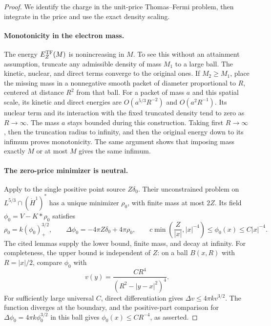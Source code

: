 \begin{proof}
We identify the charge in the unit-price Thomas--Fermi problem, then
integrate in the price and use the exact density scaling.

\paragraph{Monotonicity in the electron mass.}
The energy $E_Z^{\mathrm{TF}}(M)$ is nonincreasing in $M$.  To see this without an
attainment assumption, truncate any admissible density of mass $M_1$ to a
large ball.  The kinetic, nuclear, and direct terms converge to the
original ones.  If $M_2\ge M_1$, place the missing mass in a nonnegative
smooth packet of diameter proportional to $R$, centered at distance
$R^2$ from that ball.  For a packet of mass $a$ and this spatial scale,
its kinetic and direct energies are $O(a^{5/3}R^{-2})$ and
$O(a^2R^{-1})$.  Its nuclear term and its interaction with the fixed
truncated density tend to zero as $R\to\infty$.  The mass $a$ stays
bounded during this construction.  Taking first $R\to\infty$, then the
truncation radius to infinity, and then the original energy down to its
infimum proves monotonicity.  The same argument shows that imposing mass
exactly $M$ or at most $M$ gives the same infimum.

\paragraph{The zero-price minimizer is neutral.}
Apply \cite[\FTFPair]{Foundation} to the single positive point
source $Z\delta_0$.  Their unconstrained problem on
$L^{5/3}\cap(\dot H^1)^*$ has a unique minimizer $\rho_0$, with finite
mass at most $2Z$.  Its field $\phi_0=V-K*\rho_0$ satisfies
\begin{equation}\label{eq:tf-neutral-field}
 \rho_0=k(\phi_0)_+^{3/2},\qquad
 \Delta\phi_0=-4\pi Z\delta_0+4\pi\rho_0,\qquad
 c\min\left(\frac Z{|x|},|x|^{-4}\right)
       \le\phi_0(x)\le C|x|^{-4}.
\end{equation}
The cited lemmas supply the lower bound, finite mass, and decay at infinity.
For completeness, the upper bound is independent of $Z$: on a ball
$B(x,R)$ with $R=|x|/2$, compare $\phi_0$ with
\[
 v(y)=\frac{C R^4}{(R^2-|y-x|^2)^4}.
\]
For sufficiently large universal $C$, direct differentiation gives
$\Delta v\le4\pi k v^{3/2}$.  The function diverges at the boundary,
and the positive-part comparison for
$\Delta\phi_0=4\pi k\phi_0^{3/2}$ in this ball gives
$\phi_0(x)\le CR^{-4}$, as asserted.


\end{proof}
